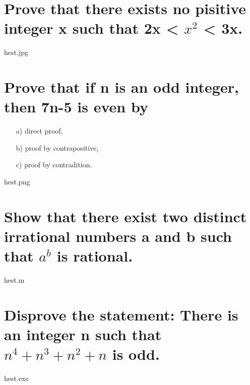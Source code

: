 \section{Prove that there exists no pisitive integer x such that 2x < $x^2$ < 3x.}
hest.jpg

\section{Prove that if n is an odd integer, then 7n-5 is even by}
\begin{itemize}
\item[a)] direct proof,
\item[b)] proof by contrapositive,
\item[c)] proof by contradition.
\end{itemize}
hest.png

\section{Show that there exist two distinct irrational numbers a and b such that $a^b$ is rational.}
hest.m

\section{Disprove the statement: There is an integer n such that $n^4+n^3+n^2+n$ is odd.}
hest.exe
